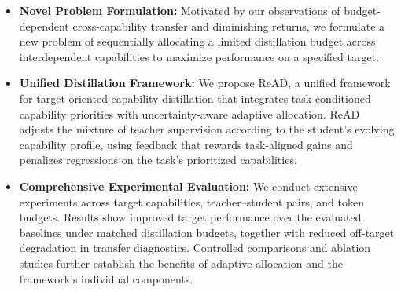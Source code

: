 \begin{itemize}[leftmargin=*, itemsep=1pt, topsep=1pt]
    \item \textbf{Novel Problem Formulation:}
    Motivated by our observations of budget-dependent cross-capability transfer and diminishing returns, we formulate a new problem of sequentially allocating a limited distillation budget across interdependent capabilities to maximize performance on a specified target.

    \item \textbf{Unified Distillation Framework:}
    We propose ReAD, a unified framework for target-oriented capability distillation that integrates task-conditioned capability priorities with uncertainty-aware adaptive allocation. ReAD adjusts the mixture of teacher supervision according to the student's evolving capability profile, using feedback that rewards task-aligned gains and penalizes regressions on the task's prioritized capabilities.

    \item \textbf{Comprehensive Experimental Evaluation:}
    We conduct extensive experiments across target capabilities, teacher--student pairs, and token budgets. Results show improved target performance over the evaluated baselines under matched distillation budgets, together with reduced off-target degradation in transfer diagnostics. Controlled comparisons and ablation studies further establish the benefits of adaptive allocation and the framework's individual components.
\end{itemize}